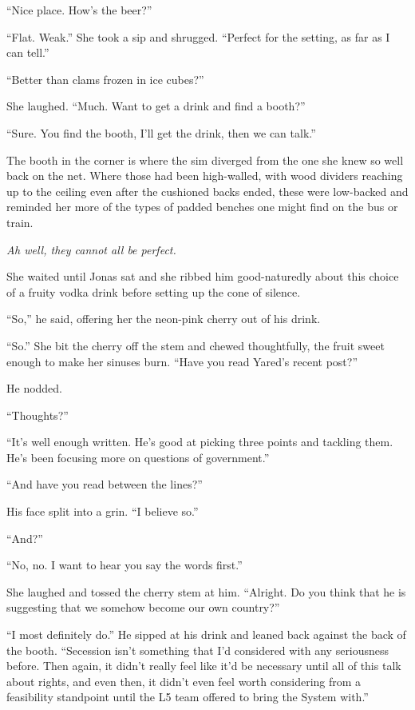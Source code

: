 ``Nice place. How's the beer?''

``Flat. Weak.'' She took a sip and shrugged. ``Perfect for the setting, as far as I can tell.''

``Better than clams frozen in ice cubes?''

She laughed. ``Much. Want to get a drink and find a booth?''

``Sure. You find the booth, I'll get the drink, then we can talk.''

The booth in the corner is where the sim diverged from the one she knew so well back on the net. Where those had been high-walled, with wood dividers reaching up to the ceiling even after the cushioned backs ended, these were low-backed and reminded her more of the types of padded benches one might find on the bus or train.

\emph{Ah well, they cannot all be perfect.}

She waited until Jonas sat and she ribbed him good-naturedly about this choice of a fruity vodka drink before setting up the cone of silence.

``So,'' he said, offering her the neon-pink cherry out of his drink.

``So.'' She bit the cherry off the stem and chewed thoughtfully, the fruit sweet enough to make her sinuses burn. ``Have you read Yared's recent post?''

He nodded.

``Thoughts?''

``It's well enough written. He's good at picking three points and tackling them. He's been focusing more on questions of government.''

``And have you read between the lines?''

His face split into a grin. ``I believe so.''

``And?''

``No, no. I want to hear you say the words first.''

She laughed and tossed the cherry stem at him. ``Alright. Do you think that he is suggesting that we somehow become our own country?''

``I most definitely do.'' He sipped at his drink and leaned back against the back of the booth. ``Secession isn't something that I'd considered with any seriousness before. Then again, it didn't really feel like it'd be necessary until all of this talk about rights, and even then, it didn't even feel worth considering from a feasibility standpoint until the L5 team offered to bring the System with.''

